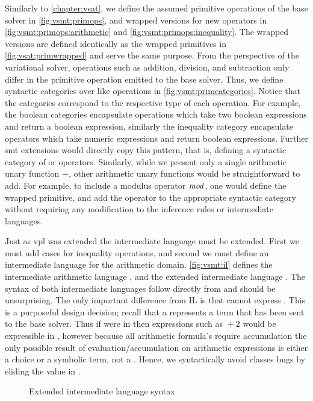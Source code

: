 Similarly to \autoref{chapter:vsat}, we define the assumed primitive operations
of the base solver in \autoref{fig:vsmt:primops}, and wrapped versions for new
operators in \autoref{fig:vsmt:primops:arithmetic} and
\autoref{fig:vsmt:primops:inequality}. The wrapped versions are defined
identically as the wrapped primitives in \autoref{fig:vsat:primwrapped} and
serve the same purpose.
%
From the perspective of the variational solver, operations such as addition,
division, and subtraction only differ in the primitive operation emitted to the
base solver. Thus, we define syntactic categories over like operations in
\autoref{fig:vsmt:primcategories}. Notice that the categories correspond to the
respective type of each operation. For example, the boolean categories
encapsulate operations which take two boolean expressions and return a boolean
expression, similarly the inequality category encapsulate operators which take
numeric expressions and return boolean expressions. Further \ac{smt} extensions
would directly copy this pattern, that is, defining a syntactic category of
 or  operators. Similarly, while we present
only a single arithmetic unary function $-$, other arithmetic unary functions
would be straightforward to add. For example, to include a modulus operator
$\mathit{mod}$, one would define the wrapped primitive, and add the operator to the
appropriate syntactic category without requiring any modification to the
inference rules or intermediate languages.

Just as \ac{vpl} was extended the intermediate language must be extended. First
we must add cases for inequality operations, and second we must define an
intermediate language for the arithmetic domain.
%
\autoref{fig:vsmt:il} defines the intermediate arithmetic language \eAR, and the
extended intermediate language \eIL. The syntax of both intermediate languages
follow directly from \evpl and should be unsurprising. The only important
difference from IL is that \eAR cannot express \unit{}. This is a purposeful
design decision; recall that a \unit{} represents a term that has been sent to
the base solver. Thus if \unit{} were in \eAR then expressions such as $\unit{}
+ 2$ would be expressible in \eAR, however because all arithmetic formula's
require accumulation the only possible result of evaluation/accumulation on
arithmetic expressions is either a choice or a symbolic term, not a \unit{}.
Hence, we syntactically avoid classes bugs by eliding the \unit{} value in \eAR.
% 
\begin{figure}
  
  \caption{Extended intermediate language syntax}%
  \label{fig:vsmt:il}
\end{figure}

